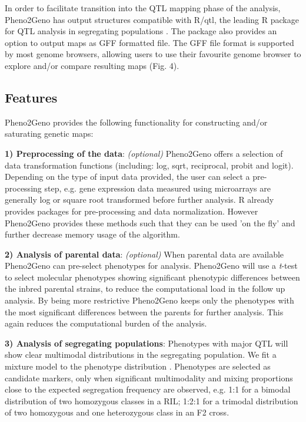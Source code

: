 In order to facilitate transition into the QTL mapping phase of the analysis, Pheno2Geno has 
output structures compatible with R/qtl, the leading R package for QTL analysis in segregating 
populations \cite{Broman:2003, Arends:2010}. The package also provides an option to output maps as 
GFF formatted file. The GFF file format is supported by most genome browsers, allowing users to 
use their favourite genome browser to explore and/or compare resulting maps (Fig. 4).

\subsection{Features}
Pheno2Geno provides the following functionality for constructing and/or saturating genetic maps:

{\bf 1) Preprocessing of the data}: \emph{(optional)} 
Pheno2Geno offers a selection of data transformation functions (including: log, sqrt, reciprocal, 
probit and logit). Depending on the type of input data provided, the user can select a 
pre-processing step, e.g. gene expression data measured using microarrays are generally log 
\cite{Quackenbush:2002} or square root \cite{Jansen:2001b, Gort:2010} transformed before further 
analysis. R already provides packages for pre-processing and data normalization. However 
Pheno2Geno provides these methods such that they can be used 'on the fly' and further decrease 
memory usage of the algorithm.

{\bf 2) Analysis of parental data}: \emph{(optional)} 
When parental data are available Pheno2Geno can pre-select phenotypes for analysis. Pheno2Geno 
will use a \emph{t}-test to select molecular phenotypes showing significant phenotypic differences 
between the inbred parental strains, to reduce the computational load in the follow up analysis. 
By being more restrictive Pheno2Geno keeps only the phenotypes with the most significant differences 
between the parents for further analysis. This again reduces the computational burden of the 
analysis.

{\bf 3) Analysis of segregating populations}:
Phenotypes with major QTL will show clear multimodal distributions in the segregating population. 
We fit a mixture model to the phenotype distribution \cite{Jansen:1993, Jansen:2001b, Benaglia:2009}. 
Phenotypes are selected as candidate markers, only when significant multimodality and mixing 
proportions close to the expected segregation frequency are observed, e.g. 1:1 for a bimodal 
distribution of two homozygous classes in a RIL; 1:2:1 for a trimodal distribution of two homozygous 
and one heterozygous class in an F2 cross.

